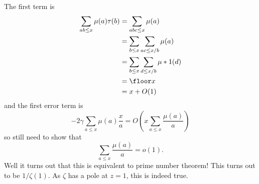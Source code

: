 \documentclass[a4paper]{article}
\begin{document}
The first term is
\begin{align*}
  \sum_{ab \leq x} \mu(a)\tau(b)
  &= \sum_{abc \leq x} \mu(a) \\
  &= \sum_{b \leq x} \sum_{ac \leq x/b} \mu(a) \\
  &= \sum_{b \leq x} \sum_{d \leq x/b} \mu * 1(d) \\
  &= \floor x \\
  &= x + O(1)
\end{align*}
and the first error term is
\[
  -2\gamma \sum_{a \leq x} \mu(a) \frac{x}{a} = O(x\sum_{a \leq x} \frac{\mu(a)}{a})
\]
so still need to show that
\[
  \sum_{a \leq x} \frac{\mu(a)}{a} = o(1).
\]
Well it turns out that this is equivalent to prime number theorem! This turns out to be \(1/\zeta(1)\). As \(\zeta\) has a pole at \(z = 1\), this is indeed true.






\printindex
\end{document}
